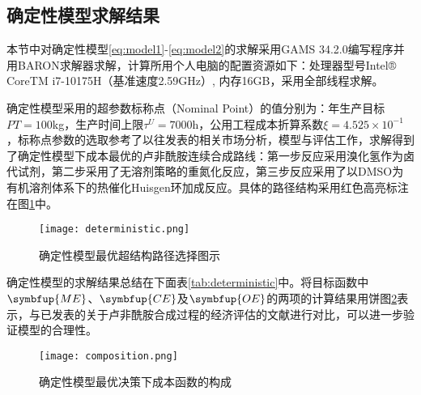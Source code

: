 \subsection{确定性模型求解结果}

本节中对确定性模型\eqref{eq:model1}-\eqref{eq:model2}的求解采用GAMS 34.2.0编写程序并用BARON求解器\cite{kilinc2018}求解，计算所用个人电脑的配置资源如下：处理器型号Intel® CoreTM i7-10175H（基准速度2.59GHz）, 内存16GB，采用全部线程求解。

确定性模型采用的超参数标称点（Nominal Point）的值分别为：年生产目标$PT=100$kg，生产时间上限$\tau^U=7000$h，公用工程成本折算系数$\xi=4.525\times10^{-1}$，标称点参数的选取参考了以往发表的相关市场分析，模型与评估工作\cite{diab2018, padmaja2018}，求解得到了确定性模型下成本最优的卢非酰胺连续合成路线：第一步反应采用溴化氢作为卤代试剂，第二步采用了无溶剂策略的重氮化反应\cite{gelonch2019}，第三步反应采用了以DMSO为有机溶剂体系下的热催化Huisgen环加成反应。具体的路径结构采用红色高亮标注在图\ref{fig:deterministic}中。

\begin{figure}[ht!]
  \centering
  \texttt{[image: deterministic.png]}
  \caption{确定性模型最优超结构路径选择图示}
  \label{fig:deterministic}
\end{figure}

确定性模型的求解结果总结在下面表\ref{tab:deterministic}中。将目标函数中$\symbfup{ME}$、$\symbfup{CE}$及$\symbfup{OE}$的两项的计算结果用饼图\ref{fig:composition}表示，与已发表的关于卢非酰胺合成过程的经济评估的文献\cite{diab2018}进行对比，可以进一步验证模型的合理性。

\begin{figure}[ht!]
  \centering
  \texttt{[image: composition.png]}
  \caption{确定性模型最优决策下成本函数的构成}
  \label{fig:composition}
\end{figure}

